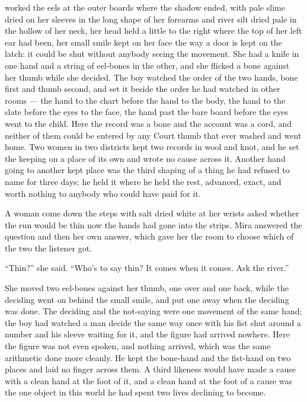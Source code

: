  worked the eels at the outer boards where the shadow ended, with pale slime dried on her sleeves in the long shape of her forearms and river silt dried pale in the hollow of her neck, her head held a little to the right where the top of her left ear had been, her small smile kept on her face the way a door is kept on the latch: it could be shut without anybody seeing the movement. She had a knife in one hand and a string of eel-bones in the other, and she flicked a bone against her thumb while she decided. The boy watched the order of the two hands, bone first and thumb second, and set it beside the order he had watched in other rooms --- the hand to the chart before the hand to the body, the hand to the slate before the eyes to the face, the hand past the bare board before the eyes went to the child. Here the record was a bone and the account was a cord, and neither of them could be entered by any Court thumb that ever washed and went home. Two women in two districts kept two records in wool and knot, and he set the keeping on a place of its own and wrote no cause across it. Another hand going to another kept place was the third shaping of a thing he had refused to name for three days; he held it where he held the rest, advanced, exact, and worth nothing to anybody who could have paid for it.

A woman come down the steps with salt dried white at her wrists asked whether the run would be thin now the hands had gone into the strips. Mira answered the question and then her own answer, which gave her the room to choose which of the two the listener got.

“Thin?” she said. “Who's to say thin? It comes when it comes. Ask the river.”

She moved two eel-bones against her thumb, one over and one back, while the deciding went on behind the small smile, and put one away when the deciding was done. The deciding and the not-saying were one movement of the same hand; the boy had watched a man decide the same way once with his fist shut around a number and his sleeve waiting for it, and the figure had arrived nowhere. Here the figure was not even spoken, and nothing arrived, which was the same arithmetic done more cleanly. He kept the bone-hand and the fist-hand on two places and laid no finger across them. A third likeness would have made a cause with a clean hand at the foot of it, and a clean hand at the foot of a cause was the one object in this world he had spent two lives declining to become.

